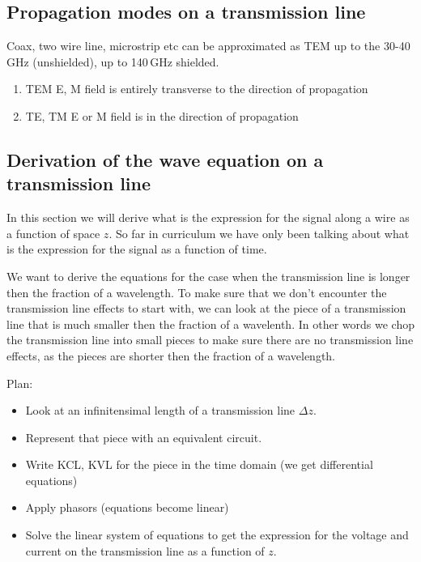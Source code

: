 \subsection{Propagation modes on a transmission line}

Coax, two wire line, microstrip etc can be approximated as TEM up to
the 30-40\,GHz (unshielded), up to 140\,GHz shielded.




\begin{enumerate}
\item TEM E, M field is entirely transverse to the direction of
propagation
\item TE, TM E or M field is in the direction of propagation
\end{enumerate}




\subsection{Derivation of the wave equation on a transmission line}\label{telegrapher}

In this section we will derive what is the expression for the signal
along a wire as a function of space $z$. So far in curriculum we have
only been talking about what is the expression for the signal as a
function of time.

We want to derive the equations for the case when the transmission
line is longer then the fraction of a wavelength. To make sure that we
don't encounter the transmission line effects to start with, we can
look at the piece of a transmission line that is much smaller then
the fraction of a wavelenth. In other words we chop the transmission
line into small pieces to make sure there are no transmission line
effects, as the pieces are shorter then the fraction of a wavelength. 

Plan:

\begin{itemize}
\item Look at an infinitensimal length of a transmission line $\Delta z$.  

\item Represent that piece with an equivalent circuit. 

\item Write KCL, KVL for the piece in the time domain (we get
differential equations)

\item Apply phasors (equations become linear)

\item Solve the linear system of equations to get the expression for
the voltage and current on the transmission line as a function of $z$.

\end{itemize}


